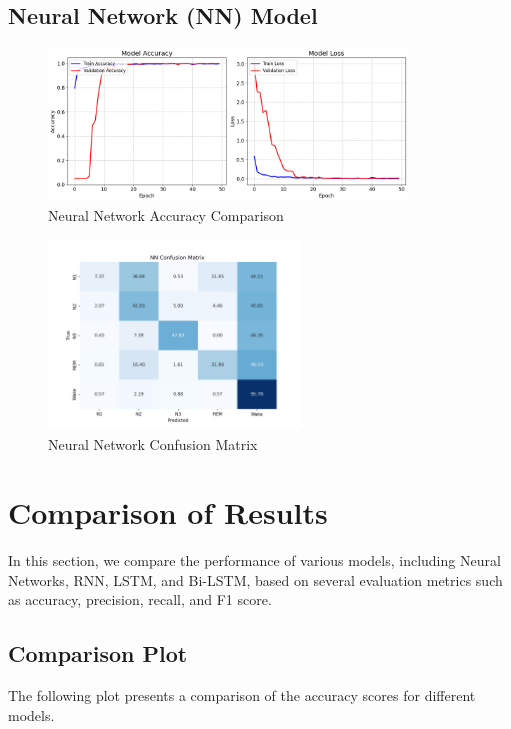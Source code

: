 \subsection{Neural Network (NN) Model}

\begin{figure}[H]
	\centering
	\includegraphics[width=0.85\textwidth]{img/paper_2/deeplearning.png}
	\caption{Neural Network Accuracy Comparison}
	\label{fig:nn_accuracy}
\end{figure}

\begin{figure}[H]
	\centering
	\includegraphics[width=0.6\textwidth]{img/paper_2/NN_cm.png}
	\caption{Neural Network Confusion Matrix}
	\label{fig:nn_cm}
\end{figure}

\section{Comparison of Results}

In this section, we compare the performance of various models, including Neural Networks, RNN, LSTM, and Bi-LSTM, based on several evaluation metrics such as accuracy, precision, recall, and F1 score.

\subsection{Comparison Plot}
The following plot presents a comparison of the accuracy scores for different models.

